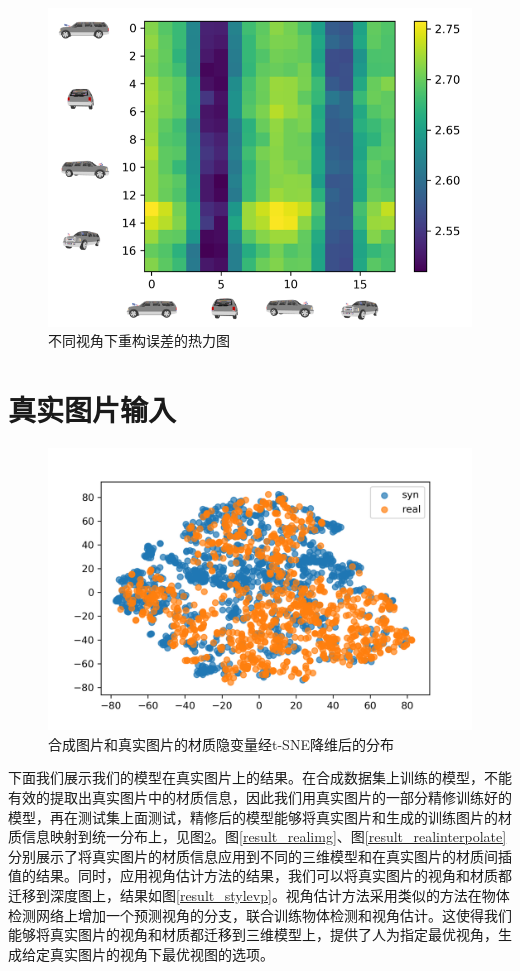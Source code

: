 \documentclass[UTF8,openany,AutoFakeBold,AutoFakeSlant,cs4size]{ctexbook}
\begin{document}
\begin{figure}
\centering
\includegraphics[width=\linewidth]{./images/vsmat_thesis.png}
\caption{不同视角下重构误差的热力图}
\label{result_heatmap}
\end{figure}

\section{真实图片输入}

\begin{figure}
\centering
\includegraphics[width=0.8\linewidth]{./images/syn_real_dist_thesis.png}
\caption{合成图片和真实图片的材质隐变量经t-SNE降维后的分布}
\label{result_dist}
\end{figure}

下面我们展示我们的模型在真实图片上的结果。在合成数据集上训练的模型，不能有效的提取出真实图片中的材质信息，因此我们用真实图片的一部分精修训练好的模型，再在测试集上面测试，精修后的模型能够将真实图片和生成的训练图片的材质信息映射到统一分布上，见图\ref{result_dist}。图\ref{result_realimg}、图\ref{result_realinterpolate}分别展示了将真实图片的材质信息应用到不同的三维模型和在真实图片的材质间插值的结果。同时，应用视角估计方法的结果，我们可以将真实图片的视角和材质都迁移到深度图上，结果如图\ref{result_stylevp}。视角估计方法采用类似\cite{Massa2016CraftingAM}的方法在物体检测网络上增加一个预测视角的分支，联合训练物体检测和视角估计。这使得我们能够将真实图片的视角和材质都迁移到三维模型上，提供了人为指定最优视角，生成给定真实图片的视角下最优视图的选项。
\end{document}
